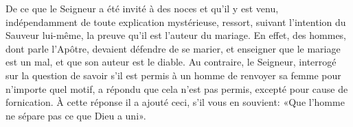 De ce que le Seigneur a été invité à des noces et qu’il y est venu,
	indépendamment de toute explication mystérieuse,
	ressort, suivant l’intention du Sauveur lui-même,
	la preuve qu’il est l’auteur du mariage.
En effet, des hommes, dont parle l’Apôtre, devaient défendre de se marier,
	et enseigner que le mariage est un mal, et que son auteur est le diable.
Au contraire, le Seigneur, interrogé sur la question de savoir
		s’il est permis à un homme de renvoyer sa femme pour n’importe quel motif,
	a répondu que cela n’est pas permis, excepté pour cause de fornication.
À cette réponse il a ajouté ceci, s’il vous en souvient:
	«Que l’homme ne sépare pas ce que Dieu a uni».
